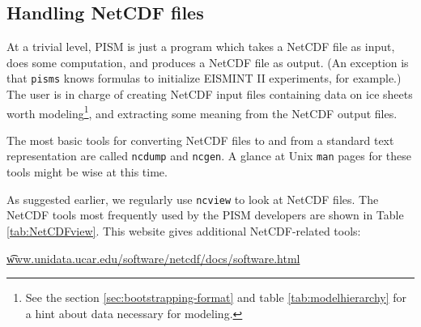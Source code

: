 \subsection{Handling NetCDF files}\label{subsect:nctoolsintro}  At a trivial level, PISM is just a program which takes a NetCDF file as input, does some computation, and produces a NetCDF file as output.  (An exception is that \verb|pisms| knows formulas to initialize EISMINT II experiments, for example.)  The user is in charge of creating NetCDF input files containing data on ice sheets worth modeling\footnote{See the section \ref{sec:bootstrapping-format} and table \ref{tab:modelhierarchy} for a hint about data necessary for modeling.}, and extracting some meaning from the NetCDF output files.

The most basic tools for converting NetCDF files to and from a standard text representation are called \verb|ncdump| and \verb|ncgen|.  A glance at Unix \verb|man| pages for these tools might be wise at this time.

As suggested earlier, we regularly use \verb|ncview| to look at NetCDF files.  The NetCDF tools most frequently used by the PISM developers are shown in Table \ref{tab:NetCDFview}.  This website gives additional NetCDF-related tools:

\centerline{ \href{http://www.unidata.ucar.edu/software/netcdf/docs/software.html}{\t{www.unidata.ucar.edu/software/netcdf/docs/software.html}} } 

